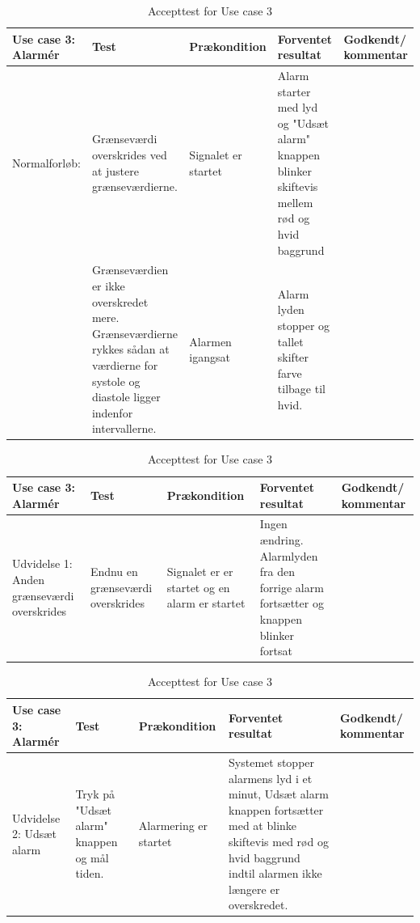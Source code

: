 \begin{table}[H]
\caption{Accepttest for Use case 3}\label{tab:tabel13}
\begin{tabular}{|>{\raggedright\arraybackslash}p{2.5cm}| >{\raggedright\arraybackslash}p{2.9cm} | >{\raggedright\arraybackslash}p{2.9cm} | >{\raggedright\arraybackslash}p{2.9cm} | >{\raggedright\arraybackslash}p{2.8cm} |}
   \hline
   \textbf{Use case 3: Alarmér } &\textbf{Test}& \textbf{Prækondition} & \textbf{Forventet resultat} & \textbf{Godkendt/ kommentar}\\ \hline
   Normalforløb:& Grænseværdi overskrides ved at justere grænseværdierne. & Signalet er startet & Alarm starter med lyd og "Udsæt alarm" knappen blinker skiftevis mellem rød og hvid baggrund &\\\hline
   & Grænseværdien er ikke overskredet mere. Grænseværdierne rykkes sådan at værdierne for systole og diastole ligger indenfor intervallerne. & Alarmen igangsat & Alarm lyden stopper og tallet skifter farve tilbage til hvid. & \\\hline
\end{tabular}
\end{table}

\begin{table}[H]
\caption{Accepttest for Use case 3}\label{tab:tabel14}
\begin{tabular}{|>{\raggedright\arraybackslash}p{2.5cm}| >{\raggedright\arraybackslash}p{2.9cm} | >{\raggedright\arraybackslash}p{2.9cm} | >{\raggedright\arraybackslash}p{2.9cm} | >{\raggedright\arraybackslash}p{2.8cm} |}
   \hline
   \textbf{Use case 3: Alarmér } &\textbf{Test}& \textbf{Prækondition} & \textbf{Forventet resultat} & \textbf{Godkendt/ kommentar}\\ \hline
   Udvidelse 1: Anden grænseværdi overskrides & Endnu en grænseværdi overskrides & Signalet er er startet og en alarm er startet & Ingen ændring. Alarmlyden fra den forrige alarm fortsætter og knappen blinker fortsat &\\\hline
\end{tabular}
\end{table}

\begin{table}[H]
\caption{Accepttest for Use case 3}\label{tab:tabel15}
\begin{tabular}{|>{\raggedright\arraybackslash}p{2.5cm}| >{\raggedright\arraybackslash}p{2.9cm} | >{\raggedright\arraybackslash}p{2.9cm} | >{\raggedright\arraybackslash}p{2.9cm} | >{\raggedright\arraybackslash}p{2.8cm} |}
   \hline
   \textbf{Use case 3: Alarmér } &\textbf{Test}& \textbf{Prækondition} & \textbf{Forventet resultat} & \textbf{Godkendt/ kommentar}\\ \hline
   Udvidelse 2: Udsæt alarm & Tryk på "Udsæt alarm" knappen og mål tiden.& Alarmering er startet & Systemet stopper alarmens lyd i et minut, Udsæt alarm knappen fortsætter med at blinke skiftevis med rød og hvid baggrund indtil alarmen ikke længere er overskredet.  &\\\hline
\end{tabular}
\end{table}


